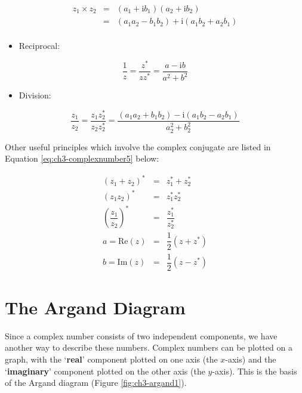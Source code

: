 \documentclass[
]{book}
\providecommand{\tightlist}{%
  \setlength{\itemsep}{0pt}\setlength{\parskip}{0pt}}
\begin{document}
\begin{equation}
\begin{array}{rcl}
z_1 \times  z_2 &=& (a_1 + \mathrm{i}b_1) (a_2 + \mathrm{i}b_2) \\
 &=& (a_1 a_2 - b_1 b_2) + \mathrm{i}(a_1 b_2 + a_2 b_1) \\
\end{array}
\end{equation}

\begin{itemize}
\tightlist
\item
  Reciprocal:
\end{itemize}

\begin{equation}
\frac{1}{z} = \frac{z^* }{z z^* } = \frac{a - \mathrm{i}b }{a^2 + b^2 }
\end{equation}

\begin{itemize}
\tightlist
\item
  Division:
\end{itemize}

\begin{equation}
\frac{z_1}{z_2} = \frac{z_1 z_2^* }{z_2 z_2^* } = \frac{(a_1 a_2 + b_1 b_2) - \mathrm{i}(a_1 b_2 - a_2 b_1)}{a_2^2 + b_2^2 }
\end{equation}

Other useful principles which involve the complex conjugate are listed in Equation \eqref{eq:ch3-complexnumber5} below:

\begin{equation}
\begin{array}{rcl}
(z_1 + z_2)^* &=& z_1^* + z_2^*\\
(z_1  z_2)^* &=& z_1^* z_2^* \\
\left( \dfrac{z_1}{z_2} \right)^* &=& \dfrac{z_1^* }{z_2^* } \\
a = \mathrm{Re}(z) &=& \dfrac{1}{2}(z + z^* ) \\
b = \mathrm{Im}(z) &=& \dfrac{1}{2}(z - z^* ) 
\end{array}
\label{eq:ch3-complexnumber5}
\end{equation}

\hypertarget{sec:ch3-arganddiagram}{%
\section{The Argand Diagram}\label{sec:ch3-arganddiagram}}

Since a complex number consists of two independent components, we have another way to describe these numbers. Complex numbers can be plotted on a graph, with the `\textbf{real}' component plotted on one axis (the \(x\)-axis) and the `\textbf{imaginary}' component plotted on the other axis (the \(y\)-axis). This is the basis of the Argand diagram (Figure \ref{fig:ch3-argand1}).
\end{document}
